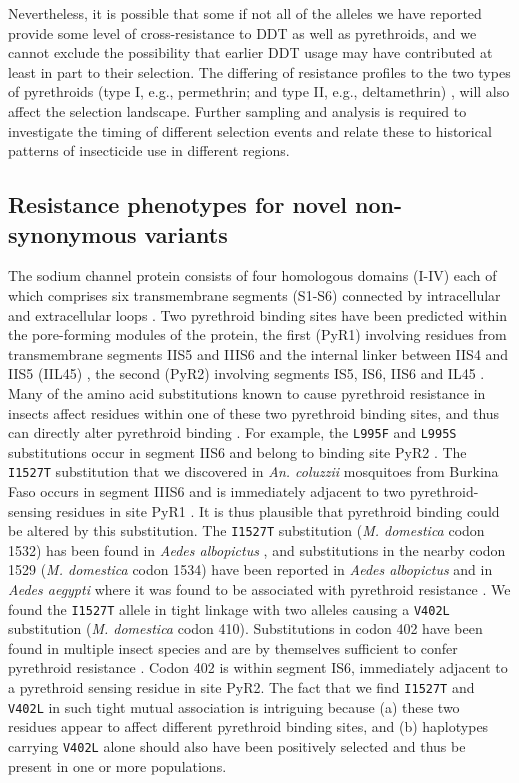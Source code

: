 \documentclass[a4paper,11pt,abstracton,hidelinks]{scrartcl}
\begin{document}
%
Nevertheless, it is possible that some if not all of the alleles we have reported provide some level of cross-resistance to DDT as well as pyrethroids, and we cannot exclude the possibility that earlier DDT usage may have contributed at least in part to their selection.
%
The differing of resistance profiles to the two types of pyrethroids (type I, e.g., permethrin; and type II, e.g., deltamethrin) \cite{Hu2011}, will also affect the selection landscape.
%
Further sampling and analysis is required to investigate the timing of different selection events and relate these to historical patterns of insecticide use in different regions.


\subsection*{Resistance phenotypes for novel non-synonymous variants}

%
The sodium channel protein consists of four homologous domains (I-IV) each of which comprises six transmembrane segments (S1-S6) connected by intracellular and extracellular loops \cite{Dong2014}.
%
Two pyrethroid binding sites have been predicted within the pore-forming modules of the protein, the first (PyR1) involving residues from transmembrane segments IIS5 and IIIS6 and the internal linker between IIS4 and IIS5 (IIL45) \cite{OReilly2006}, the second (PyR2) involving segments IS5, IS6, IIS6 and IL45 \cite{Du2013,Dong2014}.
%
Many of the amino acid substitutions known to cause pyrethroid resistance in insects affect residues within one of these two pyrethroid binding sites, and thus can directly alter pyrethroid binding \cite{Dong2014}.
%
For example, the \texttt{L995F} and \texttt{L995S} substitutions occur in segment IIS6 and belong to binding site PyR2 \cite{Du2013}.
%
The \texttt{I1527T} substitution that we discovered in \textit{An. coluzzii} mosquitoes from Burkina Faso occurs in segment IIIS6 and is immediately adjacent to two pyrethroid-sensing residues in site PyR1 \cite{Dong2014}.
%
It is thus plausible that pyrethroid binding could be altered by this substitution.
%
The \texttt{I1527T} substitution (\textit{M. domestica} codon 1532) has been found in \textit{Aedes albopictus} \cite{Xu2016}, and substitutions in the nearby codon 1529 (\textit{M. domestica} codon 1534) have been reported in \textit{Aedes albopictus} and in \textit{Aedes aegypti} where it was found to be associated with pyrethroid resistance \cite{Dong2014, Ishak2015,Li2018}.
%
We found the \texttt{I1527T} allele in tight linkage with two alleles causing a \texttt{V402L} substitution (\textit{M. domestica} codon 410).
%
Substitutions in codon 402 have been found in multiple insect species and are by themselves sufficient to confer pyrethroid resistance \cite{Dong2014}.
%
Codon 402 is within segment IS6, immediately adjacent to a pyrethroid sensing residue in site PyR2.
%
The fact that we find \texttt{I1527T} and \texttt{V402L} in such tight mutual association is intriguing because (a) these two residues appear to affect different pyrethroid binding sites, and (b) haplotypes carrying \texttt{V402L} alone should also have been positively selected and thus be present in one or more populations.
%
\end{document}
